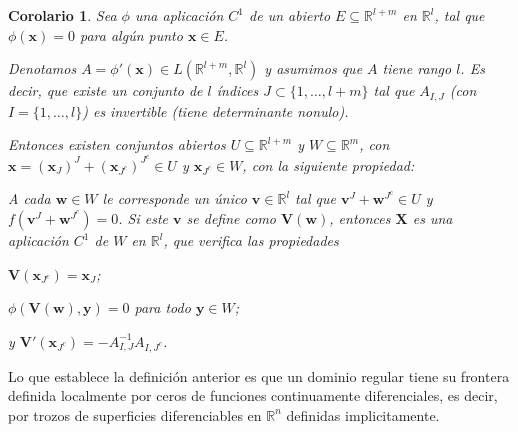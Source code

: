 \documentclass{report}
\newcommand{\realNumbers}{\mathbb{R}}
\newtheorem{corollary}{Corolario}
\theoremstyle{definition}
\theoremstyle{remark}
\begin{document}
  \begin{corollary}
    Sea \(\phi\) una aplicación \(C^1\) de un abierto \(E \subseteq \realNumbers^{l + m}\) en \(\realNumbers^l\), tal que \(\phi(\mathbf{x}) = 0\) para algún punto \(\mathbf{x} \in E\).

    Denotamos \(A = \phi'(\mathbf{x}) \in L(\realNumbers^{l + m}, \realNumbers^l)\) y asumimos que \(A\) tiene rango \(l\).
    Es decir, que existe un conjunto de \(l\) índices \(J \subset \{1, \dots, l + m\}\) tal que \(A_{I, J}\) (con \(I = \{1, \dots, l\}\)) es invertible (tiene determinante nonulo).

    Entonces existen conjuntos abiertos \(U \subseteq \realNumbers^{l + m}\) y \(W \subseteq \realNumbers^m\), con \(\mathbf{x} = (\mathbf{x}_J)^J + (\mathbf{x}_{J^c})^{J^c} \in U\) y \(\mathbf{x}_{J^c} \in W\), con la siguiente propiedad:

    A cada \(\mathbf{w} \in W\) le corresponde un único \(\mathbf{v} \in \realNumbers^l\) tal que \(\mathbf{v}^J + \mathbf{w}^{J^c} \in U\) y \(f(\mathbf{v}^J + \mathbf{w}^{J^c}) = 0\).
    Si este \(\mathbf{v}\) se define como \(\mathbf{V}(\mathbf{w})\),
    entonces \(\mathbf{X}\) es una aplicación \(C^1\) de \(W\) en \(\realNumbers^l\), que verifica las propiedades
    \begin{enumerate*}
      \item \(\mathbf{V}(\mathbf{x}_{J^c}) = \mathbf{x}_J\);
      \item \(\phi(\mathbf{V}(\mathbf{w}), \mathbf{y}) = 0\) para todo \(\mathbf{y} \in W\);
      \item y \(\mathbf{V}'(\mathbf{x}_{J^c}) = - A_{I, J}^{- 1} A_{I, J^c}\).
    \end{enumerate*}
  \end{corollary}

  Lo que establece la definición anterior es que un dominio regular tiene su frontera definida localmente por ceros de funciones continuamente diferenciales, es decir, por trozos de superficies diferenciables en \(\realNumbers^n\) definidas implicitamente.
\end{document}
